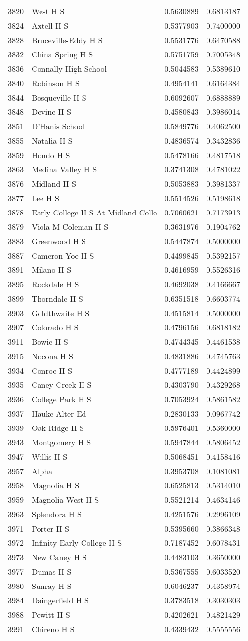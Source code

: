 \documentclass[
]{article}
\begin{document}
\begin{longtable}[]{@{}llrr@{}}
3820 & West H S & 0.5630889 & 0.6813187\tabularnewline
3824 & Axtell H S & 0.5377903 & 0.7400000\tabularnewline
3828 & Bruceville-Eddy H S & 0.5531776 & 0.6470588\tabularnewline
3832 & China Spring H S & 0.5751759 & 0.7005348\tabularnewline
3836 & Connally High School & 0.5044583 & 0.5389610\tabularnewline
3840 & Robinson H S & 0.4954141 & 0.6164384\tabularnewline
3844 & Bosqueville H S & 0.6092607 & 0.6888889\tabularnewline
3848 & Devine H S & 0.4580843 & 0.3986014\tabularnewline
3851 & D'Hanis School & 0.5849776 & 0.4062500\tabularnewline
3855 & Natalia H S & 0.4836574 & 0.3432836\tabularnewline
3859 & Hondo H S & 0.5478166 & 0.4817518\tabularnewline
3863 & Medina Valley H S & 0.3741308 & 0.4781022\tabularnewline
3876 & Midland H S & 0.5053883 & 0.3981337\tabularnewline
3877 & Lee H S & 0.5514526 & 0.5198618\tabularnewline
3878 & Early College H S At Midland Colle & 0.7060621 &
0.7173913\tabularnewline
3879 & Viola M Coleman H S & 0.3631976 & 0.1904762\tabularnewline
3883 & Greenwood H S & 0.5447874 & 0.5000000\tabularnewline
3887 & Cameron Yoe H S & 0.4499845 & 0.5392157\tabularnewline
3891 & Milano H S & 0.4616959 & 0.5526316\tabularnewline
3895 & Rockdale H S & 0.4692038 & 0.4166667\tabularnewline
3899 & Thorndale H S & 0.6351518 & 0.6603774\tabularnewline
3903 & Goldthwaite H S & 0.4515814 & 0.5000000\tabularnewline
3907 & Colorado H S & 0.4796156 & 0.6818182\tabularnewline
3911 & Bowie H S & 0.4744345 & 0.4461538\tabularnewline
3915 & Nocona H S & 0.4831886 & 0.4745763\tabularnewline
3934 & Conroe H S & 0.4777189 & 0.4424899\tabularnewline
3935 & Caney Creek H S & 0.4303790 & 0.4329268\tabularnewline
3936 & College Park H S & 0.7053924 & 0.5861582\tabularnewline
3937 & Hauke Alter Ed & 0.2830133 & 0.0967742\tabularnewline
3939 & Oak Ridge H S & 0.5976401 & 0.5360000\tabularnewline
3943 & Montgomery H S & 0.5947844 & 0.5806452\tabularnewline
3947 & Willis H S & 0.5068451 & 0.4158416\tabularnewline
3957 & Alpha & 0.3953708 & 0.1081081\tabularnewline
3958 & Magnolia H S & 0.6525813 & 0.5314010\tabularnewline
3959 & Magnolia West H S & 0.5521214 & 0.4634146\tabularnewline
3963 & Splendora H S & 0.4251576 & 0.2996109\tabularnewline
3971 & Porter H S & 0.5395660 & 0.3866348\tabularnewline
3972 & Infinity Early College H S & 0.7187452 & 0.6078431\tabularnewline
3973 & New Caney H S & 0.4483103 & 0.3650000\tabularnewline
3977 & Dumas H S & 0.5367555 & 0.6033520\tabularnewline
3980 & Sunray H S & 0.6046237 & 0.4358974\tabularnewline
3984 & Daingerfield H S & 0.3783518 & 0.3030303\tabularnewline
3988 & Pewitt H S & 0.4202621 & 0.4821429\tabularnewline
3991 & Chireno H S & 0.4339432 & 0.5555556\tabularnewline

\end{longtable}
\end{document}
